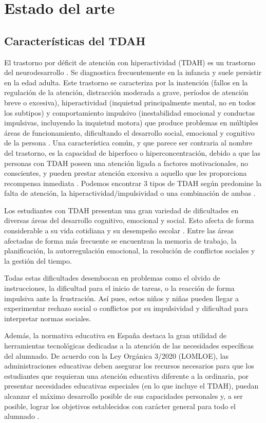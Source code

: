\section{Estado del arte}

\subsection{Características del TDAH}
El trastorno por déficit de atención con hiperactividad (TDAH) es un trastorno del neurodesarrollo \parencite{brown2007}.
Se diagnostica frecuentemente en la infancia y suele persistir en la edad adulta. 
Este trastorno se caracteriza por la inatención (fallos en la regulación de la atención, distracción moderada a grave, períodos de atención breve o excesiva), 
hiperactividad (inquietud principalmente mental, no en todos los subtipos) 
y comportamiento impulsivo (inestabilidad emocional y conductas impulsivas, incluyendo la inquietud motora) que produce problemas en múltiples áreas de funcionamiento, dificultando el desarrollo social, emocional y cognitivo de la persona \parencite{marcelo2013}.
Una característica común, y que parece ser contraria al nombre del trastorno, es la capacidad de hiperfoco o hiperconcentración, debido a que las personas con TDAH poseen una atención ligada a factores motivacionales, no conscientes, y pueden prestar atención excesiva a aquello que les proporciona recompensa inmediata \parencite{kooij2019}.
Podemos encontrar 3 tipos de TDAH según predomine la falta de atención, la hiperactividad/impulsividad o una combinación de ambas \parencite{msd_tdah_profesional}.

Los estudiantes con TDAH presentan una gran variedad de dificultades en diversas áreas del desarrollo cognitivo, emocional y social. 
Esto afecta de forma considerable a su vida cotidiana y su desempeño escolar \parencite{fundacioncadah}. 
Entre las áreas afectadas de forma más frecuente se encuentran la memoria de trabajo, la planificación, la autorregulación emocional, la resolución de conflictos sociales y la gestión del tiempo.

Todas estas dificultades desembocan en problemas como el olvido de instrucciones, la dificultad para el inicio de tareas, o la reacción de forma impulsiva ante la frustración. 
Así pues, estos niños y niñas pueden llegar a experimentar rechazo social o conflictos por su impulsividad y dificultad para interpretar normas sociales.

Además, la normativa educativa en España destaca la gran utilidad de herramientas tecnológicas dedicadas a la atención de las necesidades específicas del alumnado. 
De acuerdo con la Ley Orgánica 3/2020 (LOMLOE), las administraciones educativas deben asegurar los recursos necesarios para que los estudiantes que requieran una atención educativa diferente a la ordinaria, por presentar necesidades educativas especiales (en lo que incluye el TDAH), puedan alcanzar el máximo desarrollo posible de sus capacidades personales y, a ser posible, lograr los objetivos establecidos con carácter general para todo el alumnado \parencite{lomloe_boe}.

